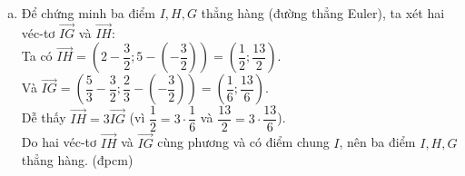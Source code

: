 \begin{vd}
{\begin{enumerate}[a)]
		\item Để chứng minh ba điểm $I, H, G$ thẳng hàng (đường thẳng Euler), ta xét hai véc-tơ $\overrightarrow{IG}$ và $\overrightarrow{IH}$:\\
		Ta có $\overrightarrow{IH} = \left(2 - \dfrac{3}{2}; 5 - \left(-\dfrac{3}{2}\right)\right) = \left(\dfrac{1}{2}; \dfrac{13}{2}\right)$.\\
		Và $\overrightarrow{IG} = \left(\dfrac{5}{3} - \dfrac{3}{2}; \dfrac{2}{3} - \left(-\dfrac{3}{2}\right)\right) = \left(\dfrac{1}{6}; \dfrac{13}{6}\right)$.\\
		Dễ thấy $\overrightarrow{IH} = 3\overrightarrow{IG}$ (vì $\dfrac{1}{2} = 3 \cdot \dfrac{1}{6}$ và $\dfrac{13}{2} = 3 \cdot \dfrac{13}{6}$).\\
		Do hai véc-tơ $\overrightarrow{IH}$ và $\overrightarrow{IG}$ cùng phương và có điểm chung $I$, nên ba điểm $I, H, G$ thẳng hàng. (đpcm)
	\end{enumerate}
}
\end{vd}

